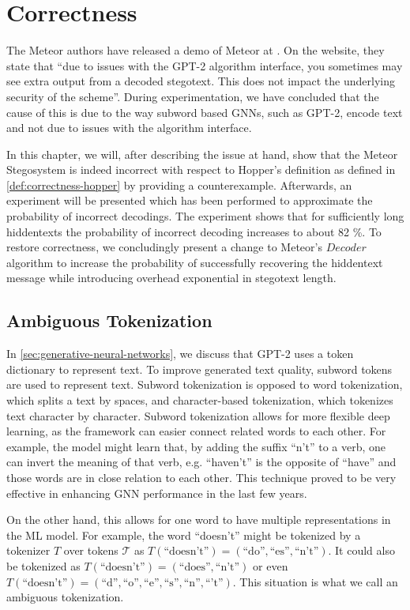\chapter{Correctness}
\label{chap:correctness}

The Meteor authors have released a demo of Meteor at \cite{MeteorDemo2021}. On the website, they state that ``due to issues with the GPT-2 algorithm interface, you sometimes may see extra output from a decoded stegotext. This does not impact the underlying security of the scheme''.
During experimentation,  we have concluded that the cause of this is due to the way subword based GNNs, such as GPT-2, encode text and not due to issues with the algorithm interface.

In this chapter, we will, after describing the issue at hand, show that the Meteor Stegosystem is indeed incorrect with respect to Hopper's definition as defined in \autoref{def:correctness-hopper} by providing a counterexample.
Afterwards, an experiment will be presented which has been performed to approximate the probability of incorrect decodings.
The experiment shows that for sufficiently long hiddentexts the probability of incorrect decoding increases to about 82 \%.
To restore correctness, we concludingly present a change to Meteor's $Decoder$ algorithm to increase the probability of successfully recovering the hiddentext message while introducing overhead exponential in stegotext length.

\section{Ambiguous Tokenization}

In \autoref{sec:generative-neural-networks}, we discuss that GPT-2 uses a token dictionary to represent text.
To improve generated text quality, subword tokens are used to represent text.
Subword tokenization is opposed to word tokenization, which splits a text by spaces, and character-based tokenization, which tokenizes text character by character.
Subword tokenization allows for more flexible deep learning, as the framework can easier connect related words to each other. 
For example, the model might learn that, by adding the suffix ``n't'' to a verb, one can invert the meaning of that verb, e.g. ``haven't'' is the opposite of ``have'' and those words are in close relation to each other.
This technique proved to be very effective in enhancing GNN performance in the last few years.

On the other hand, this allows for one word to have multiple representations in the ML model.
For example, the word ``doesn't'' might be tokenized by a tokenizer $T$ over tokens $\mathcal{T}$ as $T(\textrm{``doesn't''}) = ( \textrm{``do''}, \textrm{``es''}, \textrm{``n't''} )$.
It could also be tokenized as $T(\textrm{``doesn't''}) = ( \textrm{``does''}, \textrm{``n't''} )$ or even $T(\textrm{``doesn't''}) = ( \textrm{``d''}, \textrm{``o''}, \textrm{``e''}, \textrm{``s''}, \textrm{``n''}, \textrm{``'t''})$.
This situation is what we call an ambiguous tokenization.

